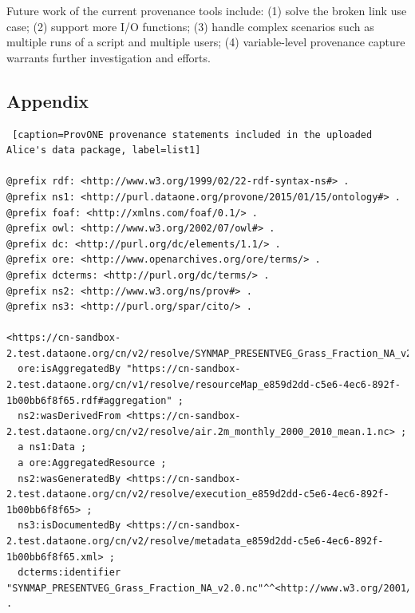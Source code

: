 \documentclass[a4paper]{llncs}
\newcommand{\authornote}[2] {
    \begin{center}
        \framebox{
            {\begin{minipage}[t]{0.9\linewidth}
                \color{red}
                \raggedright  \textbf{[#1]}~ \scriptsize #2 \normalsize
            \end{minipage}}
    }
    \end{center}
}
\begin{document}
Future work of the current provenance tools include: (1) solve the broken link use case; (2) support more I/O functions; (3) handle complex scenarios such as multiple runs of a script and multiple users; (4) variable-level provenance capture warrants further investigation and efforts.





\newpage

\begin{appendix}
\section{Appendix}  



\begin{lstlisting} [caption=ProvONE provenance statements included in the uploaded Alice's data package, label=list1] 

@prefix rdf: <http://www.w3.org/1999/02/22-rdf-syntax-ns#> .
@prefix ns1: <http://purl.dataone.org/provone/2015/01/15/ontology#> .
@prefix foaf: <http://xmlns.com/foaf/0.1/> .
@prefix owl: <http://www.w3.org/2002/07/owl#> .
@prefix dc: <http://purl.org/dc/elements/1.1/> .
@prefix ore: <http://www.openarchives.org/ore/terms/> .
@prefix dcterms: <http://purl.org/dc/terms/> .
@prefix ns2: <http://www.w3.org/ns/prov#> .
@prefix ns3: <http://purl.org/spar/cito/> .

<https://cn-sandbox-2.test.dataone.org/cn/v2/resolve/SYNMAP_PRESENTVEG_Grass_Fraction_NA_v2.0.nc>
  ore:isAggregatedBy "https://cn-sandbox-2.test.dataone.org/cn/v1/resolve/resourceMap_e859d2dd-c5e6-4ec6-892f-1b00bb6f8f65.rdf#aggregation" ;
  ns2:wasDerivedFrom <https://cn-sandbox-2.test.dataone.org/cn/v2/resolve/air.2m_monthly_2000_2010_mean.1.nc> ;
  a ns1:Data ;
  a ore:AggregatedResource ;
  ns2:wasGeneratedBy <https://cn-sandbox-2.test.dataone.org/cn/v2/resolve/execution_e859d2dd-c5e6-4ec6-892f-1b00bb6f8f65> ;
  ns3:isDocumentedBy <https://cn-sandbox-2.test.dataone.org/cn/v2/resolve/metadata_e859d2dd-c5e6-4ec6-892f-1b00bb6f8f65.xml> ;
  dcterms:identifier "SYNMAP_PRESENTVEG_Grass_Fraction_NA_v2.0.nc"^^<http://www.w3.org/2001/XMLSchema#string> .


\end{lstlisting}
\end{appendix}
\end{document}
